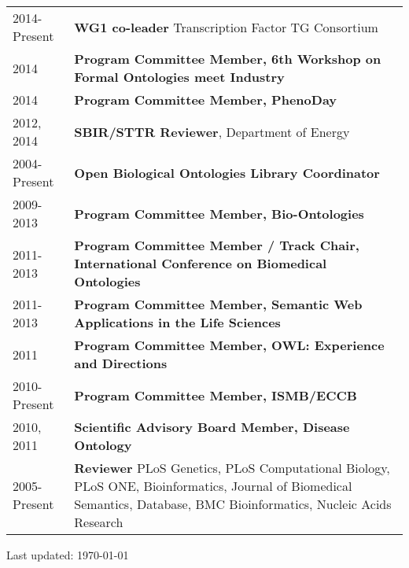 \documentclass[11pt,fullpage]{article}
\begin{document}
\begin{longtable}{p{0.5in}|p{5.5in}}

2014-Present  & \textbf{WG1 co-leader} Transcription Factor TG Consortium \\
2014 & \textbf{Program Committee Member, 6th Workshop on Formal Ontologies meet Industry}\\
2014 & \textbf{Program Committee Member, PhenoDay}\\
2012, 2014 & \textbf{SBIR/STTR Reviewer}, Department of Energy \\
2004-Present  & \textbf{Open Biological Ontologies Library Coordinator} \\
2009-2013  & \textbf{Program Committee Member, Bio-Ontologies} \\
2011-2013 & \textbf{Program Committee Member / Track Chair, International Conference on Biomedical Ontologies}\\
2011-2013 & \textbf{Program Committee Member, Semantic Web  Applications in the Life Sciences}\\
2011 & \textbf{Program Committee Member, OWL: Experience and Directions} \\
2010-Present & \textbf{Program Committee Member, ISMB/ECCB} \\
2010, 2011 & \textbf{Scientific Advisory Board Member, Disease Ontology} \\
2005-Present  & \textbf{Reviewer} PLoS Genetics, PLoS Computational
Biology, PLoS ONE, Bioinformatics, Journal of Biomedical
Semantics, Database, BMC Bioinformatics, Nucleic Acids Research\\

\end{longtable}







\bigskip
\begin{center}
  \begin{footnotesize}
    Last updated: \today
  \end{footnotesize}
\end{center}



\end{document}

